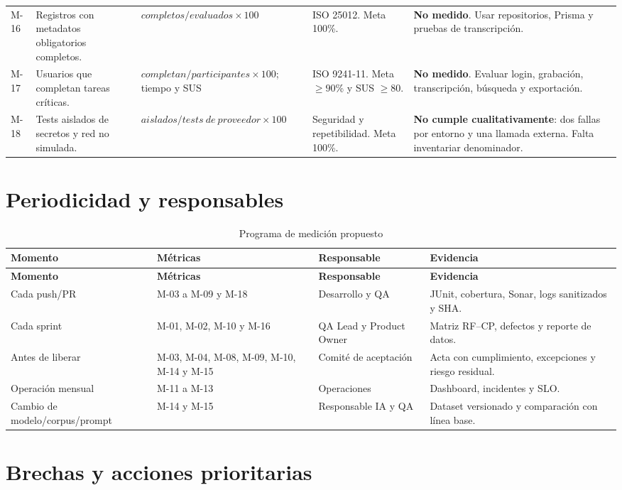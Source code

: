 \begin{landscape}
\begin{longtable}{p{1cm}p{4.2cm}p{3.6cm}p{4.5cm}p{7.5cm}}
M-16 & Registros con metadatos obligatorios completos. & $completos/evaluados\times100$ & ISO 25012. Meta 100\%. & \textbf{No medido}. Usar repositorios, Prisma y pruebas de transcripción.\\
M-17 & Usuarios que completan tareas críticas. & $completan/participantes\times100$; tiempo y SUS & ISO 9241-11. Meta $\geq90$\% y SUS $\geq80$. & \textbf{No medido}. Evaluar login, grabación, transcripción, búsqueda y exportación.\\
M-18 & Tests aislados de secretos y red no simulada. & $aislados/tests\ de\ proveedor\times100$ & Seguridad y repetibilidad. Meta 100\%. & \textbf{No cumple cualitativamente}: dos fallas por entorno y una llamada externa. Falta inventariar denominador.\\
\end{longtable}
\normalsize
\end{landscape}

\section{Periodicidad y responsables}

\begin{longtable}{p{3.1cm}p{4cm}p{3.2cm}p{5.6cm}}
\caption{Programa de medición propuesto}
\label{tab:programa-medicion-iso}\\
\toprule
\textbf{Momento} & \textbf{Métricas} & \textbf{Responsable} & \textbf{Evidencia}\\
\midrule
\endfirsthead
\toprule
\textbf{Momento} & \textbf{Métricas} & \textbf{Responsable} & \textbf{Evidencia}\\
\midrule
\endhead
\bottomrule
\endfoot
Cada push/PR & M-03 a M-09 y M-18 & Desarrollo y QA & JUnit, cobertura, Sonar, logs sanitizados y SHA.\\
Cada sprint & M-01, M-02, M-10 y M-16 & QA Lead y Product Owner & Matriz RF--CP, defectos y reporte de datos.\\
Antes de liberar & M-03, M-04, M-08, M-09, M-10, M-14 y M-15 & Comité de aceptación & Acta con cumplimiento, excepciones y riesgo residual.\\
Operación mensual & M-11 a M-13 & Operaciones & Dashboard, incidentes y SLO.\\
Cambio de modelo/corpus/prompt & M-14 y M-15 & Responsable IA y QA & Dataset versionado y comparación con línea base.\\
\end{longtable}

\section{Brechas y acciones prioritarias}

